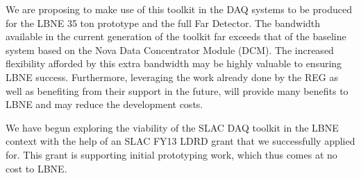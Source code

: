 We are proposing to make use of this toolkit in the DAQ systems to be produced
for the LBNE 35 ton prototype and the full Far Detector.
The bandwidth available in the current generation of the toolkit far
exceeds that of the baseline system based on the Nova Data Concentrator 
Module (DCM).
The increased flexibility afforded by this extra bandwidth may be highly valuable to 
ensuring LBNE success.
Furthermore, leveraging the work already done by the REG as well as benefiting from
their support in the future, will provide many benefits to LBNE and may reduce
the development costs.

We have begun exploring the viability of the SLAC DAQ toolkit in the LBNE
context with the help of 
an SLAC FY13 LDRD grant that we successfully applied for.
This grant is supporting initial prototyping work, which thus comes at no cost
to LBNE. 